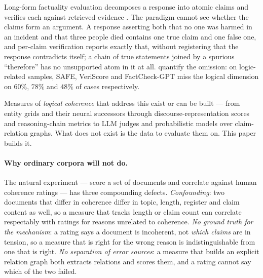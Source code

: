 Long-form factuality evaluation decomposes a response into atomic claims and verifies each against
retrieved evidence \citep{factscore,safe,veriscore}. The paradigm cannot see whether the claims form an
argument. A response asserting both that no one was harmed in an incident and that three people died
contains one true claim and one false one, and per-claim verification reports exactly that, without
registering that the response contradicts itself; a chain of true statements joined by a spurious
``therefore'' has no unsupported atom in it at all. \citet{lorefact} quantify the omission: on
logic-related samples, SAFE, VeriScore and FactCheck-GPT miss the logical dimension on $60\%$, $78\%$
and $48\%$ of cases respectively.

Measures of \emph{logical coherence} that address this exist or can be built --- from entity grids
\citep{barzilay} and their neural successors \citep{li} through discourse-representation scores
\citep{discoscore} and reasoning-chain metrics \citep{roscoe} to LLM judges \citep{geval} and
probabilistic models over claim-relation graphs. What does not exist is the data to evaluate them on.
This paper builds it.

\paragraph{Why ordinary corpora will not do.} The natural experiment --- score a set of documents and
correlate against human coherence ratings --- has three compounding defects. \emph{Confounding}: two
documents that differ in coherence differ in topic, length, register and claim content as well, so a
measure that tracks length or claim count can correlate respectably with ratings for reasons unrelated to
coherence. \emph{No ground truth for the mechanism}: a rating says a document is incoherent, not
\emph{which claims} are in tension, so a measure that is right for the wrong reason is indistinguishable
from one that is right. \emph{No separation of error sources}: a measure that builds an explicit relation
graph both extracts relations and scores them, and a rating cannot say which of the two failed.

